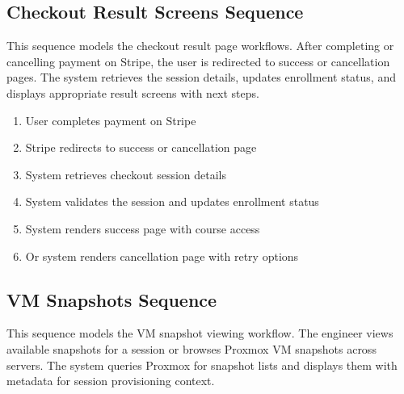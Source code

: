 %

\subsection{Checkout Result Screens Sequence}
This sequence models the checkout result page workflows. After completing or
cancelling payment on Stripe, the user is redirected to success or cancellation
pages. The system retrieves the session details, updates enrollment status, and
displays appropriate result screens with next steps.

\begin{enumerate}[topsep=0pt,itemsep=1pt,parsep=0pt,partopsep=0pt]
    \item User completes payment on Stripe
    \item Stripe redirects to success or cancellation page
    \item System retrieves checkout session details
    \item System validates the session and updates enrollment status
    \item System renders success page with course access
    \item Or system renders cancellation page with retry options
\end{enumerate}


\subsection{VM Snapshots Sequence}
This sequence models the VM snapshot viewing workflow. The engineer views
available snapshots for a session or browses Proxmox VM snapshots across
servers. The system queries Proxmox for snapshot lists and displays them with
metadata for session provisioning context.

